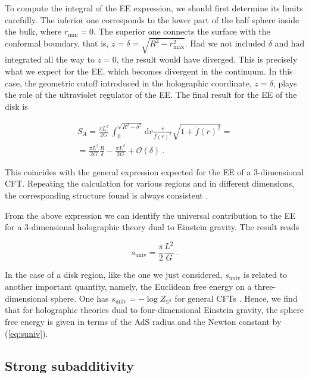 \documentclass[twocolumn]{revtex4}
\providecommand{\eq}[2]{
    \begin{equation}
        #2
    \label{eq:#1}
    \end{equation}
}
\providecommand{\eqgat}[2]{
    \begin{gather}
        #2
    \label{eq:#1}
    \end{gather}
}
\begin{document}
To compute the integral of the EE expression, we should first determine its limits carefully. The inferior one corresponds to the lower part of the half sphere inside the bulk, where $r_\text{min}=0$. The superior one connects the surface with the conformal boundary, that is, $z=\delta=\sqrt{R^2-r_\text{max}^2}$. Had we not included $\delta$ and had integrated all the way to $z=0$, the result would have diverged. This is precisely what we expect for the EE, which becomes divergent in the continuum. In this case, the geometric cutoff introduced in the holographic coordinate, $z=\delta$, plays the role of the ultraviolet regulator of the EE. The final result for the EE of the disk is 
\eqgat{1sol}{
    S_A = \frac{\pi L^2}{2G} \, \int_0^{\sqrt{R^2-\delta^2}} \mathrm{d}r \frac{r}{f(r)^2} \sqrt{ 1 + \dot{f}(r)^2 } = \nonumber \\
    = \frac{\pi L^2}{2G} \frac{R}{\delta} - \frac{\pi L^2}{2G}+\mathcal{O}(\delta) \ . \nonumber
}
This coincides with the general expression expected for the EE of  a 3-dimensional CFT. Repeating the calculation for various regions and in different dimensions, the corresponding structure found is always consistent \cite{ryu_aspects_2006,ryu_holographic_2008}. 

From the above expression we can identify the universal contribution to the EE for a 3-dimensional holographic theory dual to Einstein gravity. The result reads
\eq{suniv}{
     s_\text{univ} = \frac{\pi}{2} \frac{L^2}{G} \ .
}

In the case of a disk region, like the one we just considered, $s_\text{univ}$ is related to another important quantity, namely, the Euclidean free energy on a three-dimensional sphere. One has $s_\text{univ}= -\log Z_{\mathbb{S}^3}$ for general CFTs \cite{casini_towards_2011}. Hence, we find that for holographic theories dual to four-dimensional Einstein gravity, the sphere free energy is given in terms of the AdS radius and the Newton constant by (\ref{eq:suniv}).


\subsection{Strong subadditivity} \label{ss:SS}
\end{document}
